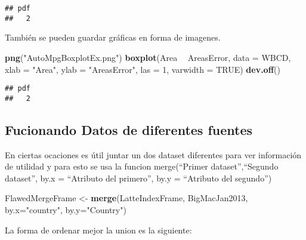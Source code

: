 \documentclass[]{article}
\newenvironment{Shaded}{\begin{snugshade}}{\end{snugshade}}
\newcommand{\DataTypeTok}[1]{\textcolor[rgb]{0.13,0.29,0.53}{#1}}
\newcommand{\DecValTok}[1]{\textcolor[rgb]{0.00,0.00,0.81}{#1}}
\newcommand{\KeywordTok}[1]{\textcolor[rgb]{0.13,0.29,0.53}{\textbf{#1}}}
\newcommand{\NormalTok}[1]{#1}
\newcommand{\OperatorTok}[1]{\textcolor[rgb]{0.81,0.36,0.00}{\textbf{#1}}}
\newcommand{\OtherTok}[1]{\textcolor[rgb]{0.56,0.35,0.01}{#1}}
\newcommand{\StringTok}[1]{\textcolor[rgb]{0.31,0.60,0.02}{#1}}
\begin{document}
\begin{verbatim}
## pdf 
##   2
\end{verbatim}

También se pueden guardar gráficas en forma de imagenes.

\begin{Shaded}
\begin{Highlighting}[]
\KeywordTok{png}\NormalTok{(}\StringTok{"AutoMpgBoxplotEx.png"}\NormalTok{)}
  \KeywordTok{boxplot}\NormalTok{(Area }\OperatorTok{~}\StringTok{ }\NormalTok{AreasError, }\DataTypeTok{data =}\NormalTok{ WBCD,}
          \DataTypeTok{xlab =} \StringTok{"Area"}\NormalTok{, }\DataTypeTok{ylab =} \StringTok{"AreasError"}\NormalTok{,}
          \DataTypeTok{las =} \DecValTok{1}\NormalTok{, }\DataTypeTok{varwidth =} \OtherTok{TRUE}\NormalTok{)}
\KeywordTok{dev.off}\NormalTok{()}
\end{Highlighting}
\end{Shaded}

\begin{verbatim}
## pdf 
##   2
\end{verbatim}

\hypertarget{fucionando-datos-de-diferentes-fuentes}{%
\subsection{Fucionando Datos de diferentes
fuentes}\label{fucionando-datos-de-diferentes-fuentes}}

En ciertas ocaciones es útil juntar un dos dataset diferentes para ver
información de utilidad y para esto se usa la funcion merge(``Primer
dataset'',``Segundo dataset'', by.x = ``Atributo del primero'', by.y =
``Atributo del segundo'')

\begin{Shaded}
\begin{Highlighting}[]
\NormalTok{FlawedMergeFrame <-}\StringTok{ }\KeywordTok{merge}\NormalTok{(LatteIndexFrame, BigMacJan2013, }\DataTypeTok{by.x=}\StringTok{"country"}\NormalTok{, }\DataTypeTok{by.y=}\StringTok{"Country"}\NormalTok{)}
\end{Highlighting}
\end{Shaded}

La forma de ordenar mejor la union es la siguiente:
\end{document}
